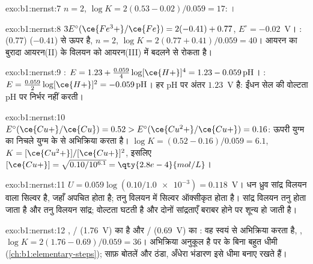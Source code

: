 \begin{solution}{exo:b1:nernst:7}
$n = 2$, $\log K = 2(0.53 - 0.02)/0.059 = 17$: ।
\end{solution}

\begin{solution}{exo:b1:nernst:8}
$3E^\circ(\ce{Fe^3+}/\ce{Fe}) = 2(-0.41) + 0.77$, $E^\circ = -0.02$~V।
:   (0.77) 
 ($-0.41$) से ऊपर है, $n = 2$, $\log K = 2(0.77 + 0.41)/0.059 = 40$। आयरन
का बुरादा आयरन(II) के विलयन को आयरन(III) में बदलने से रोकता है।
\end{solution}

\begin{solution}{exo:b1:nernst:9}
: $E = 1.23 + \frac{0.059}{4}\log [\ce{H+}]^4 =
1.23 - 0.059\,\mathrm{pH}$। : $E = \frac{0.059}{2}\log
[\ce{H+}]^2 = -0.059\,\mathrm{pH}$। हर pH पर अंतर $1.23$~V है:
ईंधन सेल की वोल्टता pH पर निर्भर नहीं करती।
\end{solution}

\begin{solution}{exo:b1:nernst:10}
$E^\circ(\ce{Cu+}/\ce{Cu}) = 0.52 > E^\circ(\ce{Cu^2+}/\ce{Cu+}) = 0.16$: ऊपरी
युग्म का   निचले युग्म के   से
अभिक्रिया करता है। $\log K = (0.52 - 0.16)/0.059 = 6.1$, $K =
[\ce{Cu^2+}]/[\ce{Cu+}]^2$, इसलिए $[\ce{Cu+}] = \sqrt{0.10/10^{6.1}} =
\qty{2.8e-4}{mol/L}$।
\end{solution}

\begin{solution}{exo:b1:nernst:11}
$U = 0.059\log(0.10/\num{1.0e-3}) = 0.118$~V। धन ध्रुव सांद्र विलयन वाला
सिल्वर है, जहाँ  अपचित होता है; तनु विलयन में
सिल्वर ऑक्सीकृत होता है। सांद्र विलयन तनु होता जाता है
और तनु विलयन सांद्र; वोल्टता घटती है और दोनों सांद्रताएँ बराबर होने पर
शून्य हो जाती है।
\end{solution}

\begin{solution}{exo:b1:nernst:12}
, / (1.76~V) का  है और / (0.69~V)
का : वह स्वयं से अभिक्रिया करता है, ,
$\log K = 2(1.76 - 0.69)/0.059 = 36$। अभिक्रिया अनुकूल है पर  के बिना
बहुत धीमी (\cref{ch:b1:elementary-steps}); साफ़ बोतलें
और ठंडा, अँधेरा भंडारण इसे धीमा बनाए रखते हैं।
\end{solution}

